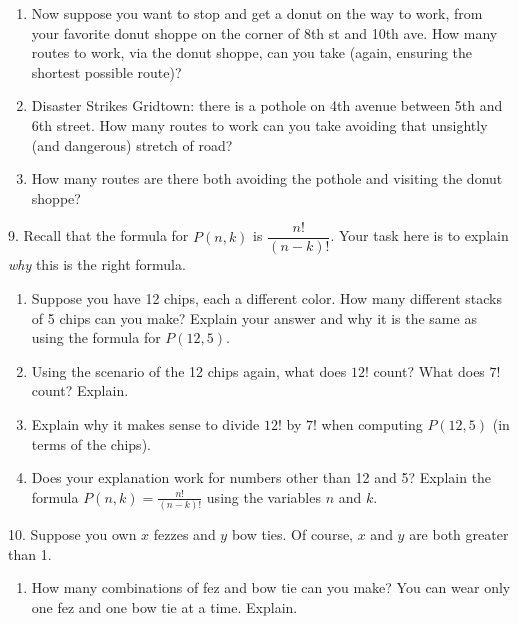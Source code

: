 \documentclass[10pt,]{book}
\theoremstyle{plain}
\theoremstyle{definition}
\theoremstyle{definition}
\theoremstyle{definition}
\numberwithin{equation}{section}
\begin{document}
\begin{exerciselist}
\begin{enumerate}[label=(\alph*)]
                
\item\hypertarget{li-789}{}
                Now suppose you want to stop and get a donut on the way to work, from your favorite donut shoppe on the corner of 8th st and 10th ave. How many routes to work, via the donut shoppe, can you take (again, ensuring the shortest possible route)?

                
\item\hypertarget{li-790}{}
                Disaster Strikes Gridtown: there is a pothole on 4th avenue between 5th and 6th street. How many routes to work can you take avoiding that unsightly (and dangerous) stretch of road?

                
\item\hypertarget{li-791}{}
                How many routes are there both avoiding the pothole and visiting the donut shoppe?

                
\end{enumerate}
\par\smallskip
\item[9.]\hypertarget{exercise-132}{}
            Recall that the formula for \(P(n,k)\) is \(\dfrac{n!}{(n-k)!}\). Your task here is to explain \emph{why} this is the right formula.
\leavevmode%
\begin{enumerate}[label=(\alph*)]
\item\hypertarget{li-792}{}
                Suppose you have 12 chips, each a different color. How many different stacks of 5 chips can you make? Explain your answer and why it is the same as using the formula for \(P(12,5)\).

                
\item\hypertarget{li-793}{}
                Using the scenario of the 12 chips again, what does \(12!\) count? What does \(7!\) count? Explain.

                
\item\hypertarget{li-794}{}
                Explain why it makes sense to divide \(12!\) by \(7!\) when computing \(P(12,5)\) (in terms of the chips).

                
\item\hypertarget{li-795}{}
                Does your explanation work for numbers other than 12 and 5? Explain the formula \(P(n,k) = \frac{n!}{(n-k)!}\) using the variables \(n\) and \(k\).

                
\end{enumerate}
\par\smallskip
\item[10.]\hypertarget{exercise-133}{}
            Suppose you own \(x\) fezzes and \(y\) bow ties. Of course, \(x\) and \(y\) are both greater than 1.
\leavevmode%
\begin{enumerate}[label=(\alph*)]
\item\hypertarget{li-796}{}
                How many combinations of fez and bow tie can you make? You can wear only one fez and one bow tie at a time. Explain.


\end{enumerate}
\end{exerciselist}
\end{document}
